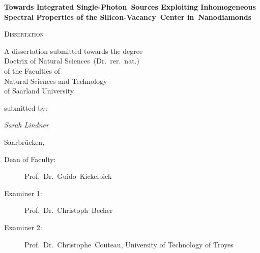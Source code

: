 




\begin{titlepage}
	\centering
	\null\vfill

	{\huge\bfseries Towards Integrated Single-Photon~Sources Exploiting Inhomogeneous Spectral Properties of the Silicon-Vacancy~Center in~Nanodiamonds\par}



	\vfill

	{\scshape\Large Dissertation}
	\vfill


	{\large A dissertation submitted towards the degree\\
	Doctrix of Natural Sciences~(Dr.~rer.~nat.)\\
	of the Faculties of\\
  Natural Sciences and Technology\\
	of Saarland University}


	\vfill
	submitted by:
	\vfill

	{\Large\itshape Sarah Lindner}

	\vfill

	{\large Saarbr\"ucken, \thesisdate{}}
	\vfill
\end{titlepage}



\newpage
\thispagestyle{plain}
\null
\vfill
\begin{description}
 	\item[Dean of Faculty:] Prof.~Dr.~Guido~Kickelbick
	\item[Examiner 1:] Prof.~Dr.~Christoph~Becher
	\item[Examiner 2:] Prof.~Dr.~Christophe~Couteau, University of Technology of Troyes
\end{description}

\newpage
